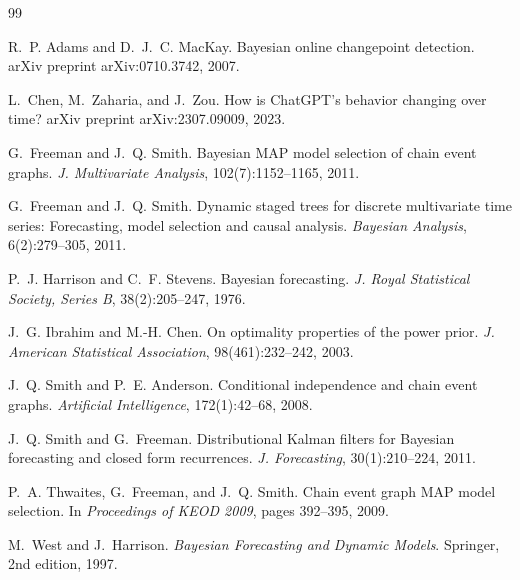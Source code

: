 \documentclass[11pt]{article}
\begin{document}
\begin{thebibliography}{99}

R.~P. Adams and D.~J.~C. MacKay.
\newblock Bayesian online changepoint detection.
\newblock arXiv preprint arXiv:0710.3742, 2007.

L.~Chen, M.~Zaharia, and J.~Zou.
\newblock How is {ChatGPT}'s behavior changing over time?
\newblock arXiv preprint arXiv:2307.09009, 2023.

G.~Freeman and J.~Q. Smith.
\newblock Bayesian {MAP} model selection of chain event graphs.
\newblock \emph{J. Multivariate Analysis}, 102(7):1152--1165, 2011.

G.~Freeman and J.~Q. Smith.
\newblock Dynamic staged trees for discrete multivariate time series: Forecasting, model selection and causal analysis.
\newblock \emph{Bayesian Analysis}, 6(2):279--305, 2011.

P.~J. Harrison and C.~F. Stevens.
\newblock Bayesian forecasting.
\newblock \emph{J. Royal Statistical Society, Series B}, 38(2):205--247, 1976.

J.~G. Ibrahim and M.-H. Chen.
\newblock On optimality properties of the power prior.
\newblock \emph{J. American Statistical Association}, 98(461):232--242, 2003.

J.~Q. Smith and P.~E. Anderson.
\newblock Conditional independence and chain event graphs.
\newblock \emph{Artificial Intelligence}, 172(1):42--68, 2008.

J.~Q. Smith and G.~Freeman.
\newblock Distributional {K}alman filters for {B}ayesian forecasting and closed form recurrences.
\newblock \emph{J. Forecasting}, 30(1):210--224, 2011.

P.~A. Thwaites, G.~Freeman, and J.~Q. Smith.
\newblock Chain event graph {MAP} model selection.
\newblock In \emph{Proceedings of KEOD 2009}, pages 392--395, 2009.

M.~West and J.~Harrison.
\newblock \emph{Bayesian Forecasting and Dynamic Models}.
\newblock Springer, 2nd edition, 1997.

\end{thebibliography}
\end{document}
